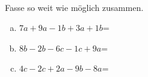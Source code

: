 \begin{aufgabe} ~ \\ 
Fasse so weit wie möglich zusammen.\begin{enumerate}[a)] 
\item 
$7a+9a-1b+3a+1b$=
\item 
$8b-2b-6c-1c+9a$=
\item 
$4c-2c+2a-9b-8a$=
\end{enumerate} 
\end{aufgabe} 
